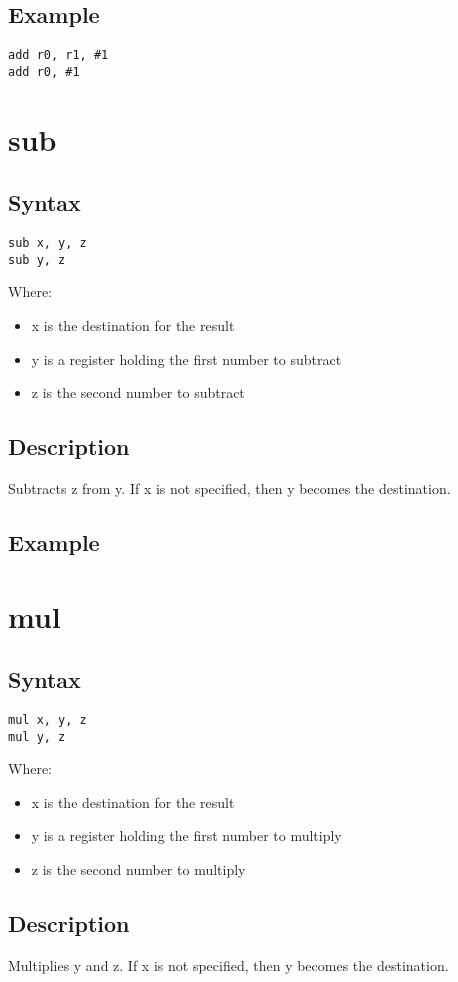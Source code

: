 \documentclass[11pt]{scrartcl}
\begin{document}
\subsection{Example}
\begin{verbatim}
add r0, r1, #1
add r0, #1
\end{verbatim}

\section{sub}
\subsection{Syntax}
\begin{verbatim}
sub x, y, z
sub y, z
\end{verbatim}
Where:
\begin{itemize}
    \item x is the destination for the result
    \item y is a register holding the first number to subtract
    \item z is the second number to subtract
\end{itemize}
\subsection{Description}
Subtracts z from y. If x is not specified, then y becomes the destination.
\subsection{Example}

\section{mul}
\subsection{Syntax}
\begin{verbatim}
mul x, y, z
mul y, z
\end{verbatim}
Where:
\begin{itemize}
    \item x is the destination for the result
    \item y is a register holding the first number to multiply
    \item z is the second number to multiply
\end{itemize}
\subsection{Description}
Multiplies y and z. If x is not specified, then y becomes the destination.
\end{document}
